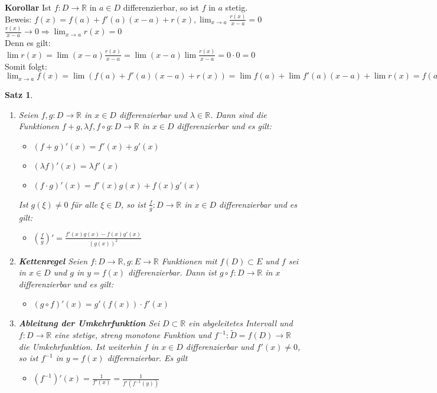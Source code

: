 \documentclass[ngerman,titlepage,twoside, parskip=half*]{scrreprt}
\newcommand*{\R}{\mathbb{R}}
\theoremstyle{plain}
\newtheorem{theorem}{Satz}[section]
\theoremstyle{definition}
\theoremstyle{remark}
\begin{document}
\textbf{Korollar} Ist $f\colon D\rightarrow\R$ in $a\in D$ differenzierbar, so ist $f$ in $a$ stetig.\\
Beweis: $f(x)=f(a)+f'(a)(x-a)+r(x), \lim_{x\rightarrow a}\frac{r(x)}{x-a}=0$\\
$\frac{r(x)}{x-a}\rightarrow 0 \Rightarrow \lim_{x\rightarrow a}r(x)=0$\\
Denn es gilt: $\lim r(x)=\lim (x-a)\frac{r(x)}{x-a}=\lim (x-a)\lim\frac{r(x)}{x-a}=0\cdot 0=0$\\
Somit folgt: $\lim_{x\rightarrow a}f(x)=\lim(f(a)+f'(a)(x-a)+r(x))=\lim f(a)+\lim f'(a)(x-a)+\lim r(x)
=f(a)+0+0=f(a)$

\begin{theorem}
\begin{enumerate}[(1)]
  \item Seien $f,g\colon D\rightarrow \R$ in $x\in D$ differenzierbar und $\lambda\in\R$. Dann sind die 
    Funktionen $f+g, \lambda f, f\circ g\colon D\rightarrow\R$ in $x\in D$ differenzierbar und es gilt:
    \begin{itemize}
      \item $(f+g)'(x)=f'(x)+g'(x)$
      \item $(\lambda f)'(x)=\lambda f'(x)$
      \item $(f\cdot g)'(x)=f'(x)g(x)+f(x)g'(x)$
    \end{itemize}
    Ist $g(\xi)\neq 0$ für alle $\xi\in D$, so ist $\frac{f}{g}\colon D\rightarrow\R$ in $x\in D$ differenzierbar 
    und es gilt:
    \begin{itemize}
      \item $(\frac{f}{g})'=\frac{f'(x)g(x)-f(x)g'(x)}{(g(x))^2}$
    \end{itemize}
  \item \textbf{Kettenregel} Seien $f\colon D\rightarrow\R, g\colon E\rightarrow\R$ Funktionen mit $f(D)\subset E$ und
    $f$ sei in $x\in D$ und $g$ in $y=f(x)$ differenzierbar. Dann ist $g\circ f\colon D\rightarrow\R$ in $x$
    differenzierbar und es gilt:
    \begin{itemize}
      \item $(g\circ f)'(x)=g'(f(x))\cdot f'(x)$
    \end{itemize}
  \item \textbf{Ableitung der Umkehrfunktion} Sei $D\subset \R$ ein abgeleitetes Intervall und 
    $f\colon D\rightarrow\R$ eine stetige, streng monotone Funktion und $f^{-1}\colon\tilde{D}=f(D)\rightarrow\R$
    die Umkehrfunktion. Ist weiterhin $f$ in $x\in D$ differenzierbar und $f'(x)\neq 0$, so ist
    $f^{-1}$ in $y=f(x)$ differenzierbar. Es gilt
    \begin{itemize}
      \item $(f^{-1})'(x)=\frac{1}{f'(x)}=\frac{1}{f'(f^{-1}(y))}$
    \end{itemize}
\end{enumerate}
\end{theorem}
\end{document}
